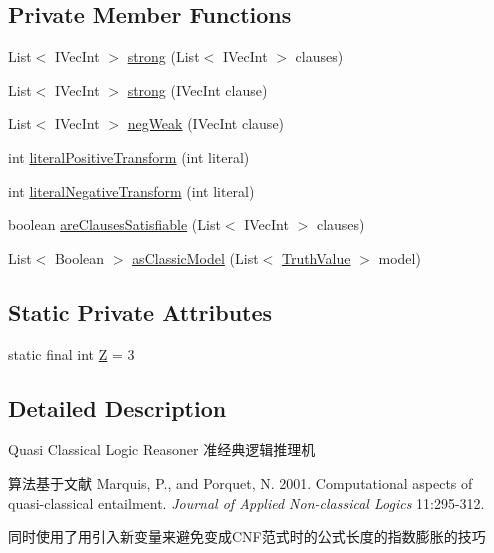 \subsection*{Private Member Functions}
\begin{DoxyCompactItemize}
\item 
List$<$ IVecInt $>$ \hyperlink{classedu_1_1pku_1_1id_1_1_q_c_reasoner_a11930b7f5e8427253338a98508fb1072}{strong} (List$<$ IVecInt $>$ clauses)
\item 
List$<$ IVecInt $>$ \hyperlink{classedu_1_1pku_1_1id_1_1_q_c_reasoner_ad841248cfd8f06335268248973876c17}{strong} (IVecInt clause)
\item 
List$<$ IVecInt $>$ \hyperlink{classedu_1_1pku_1_1id_1_1_q_c_reasoner_a52b070b2beb0989d50be56bb9d4864f0}{negWeak} (IVecInt clause)
\item 
int \hyperlink{classedu_1_1pku_1_1id_1_1_q_c_reasoner_a9dd63d2e49f6f5b53c4da1f74886708f}{literalPositiveTransform} (int literal)
\item 
int \hyperlink{classedu_1_1pku_1_1id_1_1_q_c_reasoner_aa2ab8c28775a0f950ea4932f056cc68e}{literalNegativeTransform} (int literal)
\item 
boolean \hyperlink{classedu_1_1pku_1_1id_1_1_q_c_reasoner_a96555b78c68cdc49f34d27ce44cdfdc1}{areClausesSatisfiable} (List$<$ IVecInt $>$ clauses)
\item 
List$<$ Boolean $>$ \hyperlink{classedu_1_1pku_1_1id_1_1_q_c_reasoner_aec484fe6e1aeaae5ba59f45da88a9f87}{asClassicModel} (List$<$ \hyperlink{namespaceedu_1_1pku_1_1id_a01cdd35063021f272bd905de5f43f634}{TruthValue} $>$ model)
\end{DoxyCompactItemize}
\subsection*{Static Private Attributes}
\begin{DoxyCompactItemize}
\item 
static final int \hyperlink{classedu_1_1pku_1_1id_1_1_q_c_reasoner_af0acf65658bdcdc6c8c4dc45652a85a9}{Z} = 3
\end{DoxyCompactItemize}


\subsection{Detailed Description}
Quasi Classical Logic Reasoner 准经典逻辑推理机 \par
 算法基于文献 Marquis, P., and Porquet, N. 2001. Computational aspects of quasi-\/classical entailment. {\itshape Journal of Applied Non-\/classical Logics\/} 11:295-\/312. \par
 同时使用了用引入新变量来避免变成CNF范式时的公式长度的指数膨胀的技巧 

